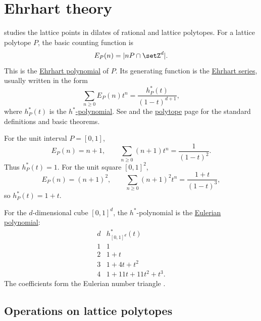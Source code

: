 
\section[ehrhart]{Ehrhart theory}

\label{ehrhartTheory} studies the lattice points in
dilates of rational and lattice polytopes.  For a lattice polytope \(P\), the
basic counting function is
\[
  E_P(n)=|nP\cap \setZ^d|.
\]
This is the \hyperref[ehrhartPolynomialDefinition]{Ehrhart polynomial} of
\(P\).  Its generating function is the
\hyperref[ehrhartSeries]{Ehrhart series}, usually written in the form
\[
  \sum_{n\geq 0} E_P(n)t^n
  =
  \frac{h^*_P(t)}{(1-t)^{d+1}},
\]
where \(h^*_P(t)\) is the
\hyperref[hStarPolynomial]{\(h^*\)-polynomial}.  See
\cite{Stanley1993,Beck2007} and the \hyperref[ehrhartPolytopes]{polytope}
page for the standard definitions and basic theorems.

\begin{example}
For the unit interval \(P=[0,1]\),
\[
  E_P(n)=n+1,\qquad
  \sum_{n\geq 0}(n+1)t^n=\frac{1}{(1-t)^2}.
\]
Thus \(h^*_P(t)=1\).  For the unit square \([0,1]^2\),
\[
  E_P(n)=(n+1)^2,\qquad
  \sum_{n\geq 0}(n+1)^2t^n=\frac{1+t}{(1-t)^3},
\]
so \(h^*_P(t)=1+t\).
\end{example}

\begin{example}
For the \(d\)-dimensional cube \([0,1]^d\), the \(h^*\)-polynomial is the
\hyperref[eulerianPolynomial]{Eulerian polynomial}:
\[
\begin{array}{c|l}
d & h^*_{[0,1]^d}(t)\\
\hline
1 & 1\\
2 & 1+t\\
3 & 1+4t+t^2\\
4 & 1+11t+11t^2+t^3.
\end{array}
\]
The coefficients form the Eulerian number triangle .
\end{example}

\subsection[ehrhartOperations]{Operations on lattice polytopes}

